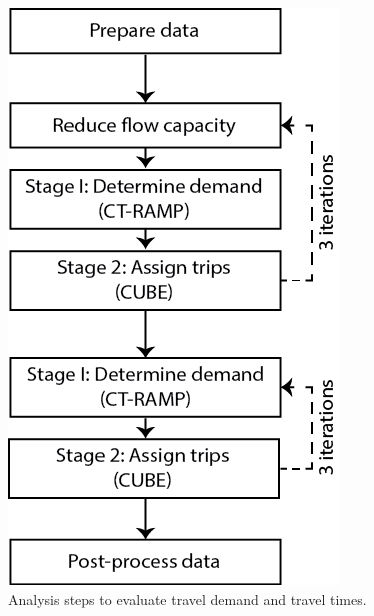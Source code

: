 \begin{figure}[!htb]
\centering
\includegraphics{FIGS/CUBEflowchart.png} 
\caption{Analysis steps to evaluate travel demand and travel times.}
\label{fig:traffic_model}
\end{figure}



